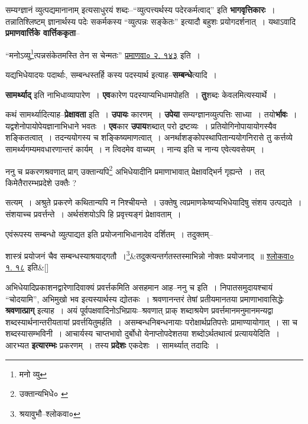 \documentclass[article,12pt,a4paper]{memoir}
\begin{document}
	  \pstart सम्यग्ज्ञानं व्युत्पद्यमानानाम् इत्यसाधुरयं शब्दः--“व्युत्पत्त्यर्थस्य पदेरकर्मत्वाद्” इति \textbf{भागवृत्तिकारः} । तन्नातिश्लिष्टम् ज्ञानार्थस्य पदेः सकर्मकस्य “व्युत्पन्नः सङ्केतः” इत्यादौ बहुशः प्रयोगदर्शनात् । यथाऽवादि \textbf{प्रमाणवार्त्तिके वार्त्तिककृता}--
	\pend
      

	  \pstart “मनोऽव्यु\footnote{मनो व्यु}\-त्पन्नसंकेतमस्ति तेन स चेन्मतः” \href{http://http://sarit.indology.info/?cref=pv.2.143}{प्रमाणवा० २. १४३} इति ।
	\pend
      

	  \pstart यद्यभिधेयादयः पदार्थाः, सम्बन्धस्तर्हि कस्य पदस्यार्थ इत्याह--\textbf{सम्बन्धे}त्यादि ।
	\pend
      

	  \pstart \textbf{सामर्थ्याद्} इति नाभिधाव्यापारेण । \textbf{एव}कारेण पदस्याप्यभिधामपोहति । \textbf{तु}शब्दः केवलमित्यस्यार्थे ।
	\pend
      

	  \pstart कथं सामर्थ्यादित्याह--\textbf{प्रेक्षावता} इति । \textbf{उपायः} कारणम् । \textbf{उपेया} सम्यग्ज्ञानव्युत्पत्तिः साध्या । तयो\textbf{र्भावः} । यद्वशेनोपायोपेयज्ञानाभिधाने भवतः । \textbf{एव}कार \textbf{उपाय}शब्दात् परो द्रष्टव्यः । प्रतियोगिनोपायायोगस्यैव शङ्कितत्वात् । तदन्ययोगस्य च शङ्किष्यमाणत्वात् । अनर्थाशङ्कोपस्थापितान्ययोगनिरासे तु कर्त्तव्ये सामर्थ्यगम्यमवधारणान्तरं कार्यम् । न त्विदमेव वाच्यम् । नान्य इति च नान्य एवेत्यवसेयम् ।
	\pend
	  \bigskip
	  \begingroup
	

	  \pstart ननु च प्रकरणश्रवणात् प्राग् उक्तान्यपि\footnote{उक्तान्यभिधे० \cite{dp-msB}} अभिधेयादीनि प्रमाणाभावात् प्रेक्षावद्भिर्न गृह्यन्ते । तत् किमेतैरारम्भप्रदेशे उक्तैः ?
	\pend
       

	  \pstart सत्यम् । अश्रुते प्रकरणे कथितान्यपि न निश्चीयन्ते । उक्तेषु त्वप्रमाणकेष्वप्यभिधेयादिषु संशय उत्पद्यते । संशयाच्च प्रवर्त्तन्ते । अर्थसंशयोऽपि हि प्रवृत्त्यङ्गं प्रेक्षावताम् ।
	\pend
      
	  \endgroup
	

	  \pstart एवंरूपस्य सम्बन्धो व्युत्पाद्यत इति प्रयोजनाभिधानादेव दर्शितम् । तदुक्तम्--
	\pend
      
	  \bigskip
	  \begingroup
	
	    
	    \stanza[\smallbreak]
	शास्त्रं प्रयोजनं चैव सम्बन्धस्याश्रयाद्गतौ ।\footnote{श्रयावुभौ--श्लोकवा०}&तदुक्त्यन्तर्गतस्तस्माभिन्नो नोक्तः प्रयोजनाद् ॥ \href{http://http://sarit.indology.info/?cref=śv.1.18}{श्लोकवा० १. १८} इति\&[\smallbreak]


	
	  \endgroup
	

	  \pstart अभिधेयादिप्रकाशनद्वारेणादिवाक्यं प्रवर्त्तकमिति असहमान आह--ननु च इति । निपातसमुदायश्चायं “चोदयामि”, अभिमुखो भव इत्यस्यार्थस्य द्योतकः । श्रवणानन्तरं तेषां प्रतीयमानतया प्रमाणाभावासिद्धेः \textbf{श्रवणात्प्राग्} इत्याह । अयं पूर्वपक्षवादिनोऽभिप्रायः--श्रवणात् प्राक् शब्दाश्रयेण प्रवर्त्तमानमनुमानमन्यद्वा शब्दस्यार्थनान्तरीयतायां प्रवर्त्तयितुमर्हति । असम्बन्धनिबन्धनायाः परोक्षार्थप्रतिपत्तेः प्रामाण्यायोगात् । सा च शब्दस्यासम्भविनी । आचार्यस्य चाप्तभावो दुर्बोधो येनाप्तोपदेशतया शब्दोऽर्थतथात्वं प्रत्याययेदिति । आरभ्यत \textbf{इत्यारम्भः} प्रकरणम् । तस्य \textbf{प्रदेशः} एकदेशः । सामर्थ्यात् तदादिः ।
	\pend
      
\end{document}
